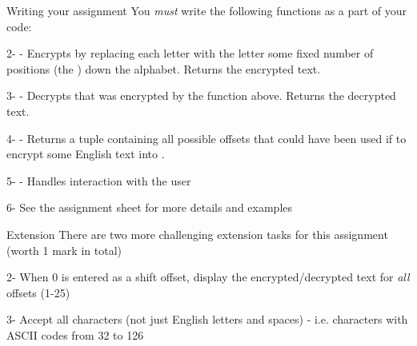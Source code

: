 \documentclass[week3]{csse1001}
\begin{document}
\begin{topic}{Writing your assignment}
You \textit{must} write the following functions as a part of your code:\\

\begin{subtopic}{2-}
 - Encrypts  by replacing each letter with the letter some fixed number of positions (the ) down the alphabet. Returns the encrypted text.
\end{subtopic}

\begin{subtopic}{3-}
 - Decrypts  that was encrypted by the function above. Returns the decrypted text.
\end{subtopic}

\begin{subtopic}{4-}
 - Returns a tuple containing all possible offsets that could have been used if to encrypt some English text into .
\end{subtopic}

\begin{subtopic}{5-}
 - Handles interaction with the user
\end{subtopic}

\begin{subtopic}{6-}
See the assignment sheet for more details and examples
\end{subtopic}

\end{topic}

\begin{topic}{Extension}
There are two more challenging extension tasks for this assignment (worth 1 mark in total)\\

\begin{subtopic}{2-}
When 0 is entered as a shift offset, display the encrypted/decrypted text for \textit{all} offsets (1-25)
\end{subtopic}

\begin{subtopic}{3-}
Accept all characters (not just English letters and spaces) - i.e. characters with ASCII codes from 32 to 126
\end{subtopic}

\end{topic}
\end{document}
